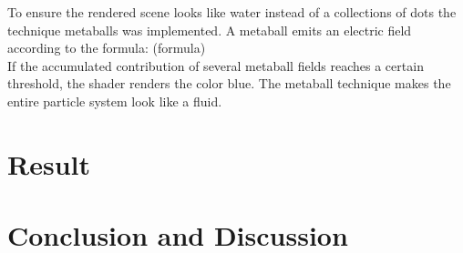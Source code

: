 \documentclass[a4paper,12pt,twoside]{report}
\begin{document}
\noindent To ensure the rendered scene looks like water instead of a collections of dots the technique metaballs was implemented. A metaball emits an electric field according to the formula: (formula) \\

\noindent  If the accumulated contribution of several metaball fields reaches a certain threshold, the shader renders the color blue. The metaball technique makes the entire particle system look like a fluid.

\chapter{Result}



\chapter{Conclusion and Discussion}


\end{document}

